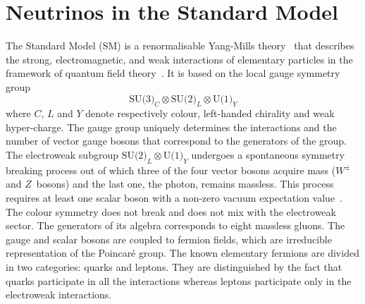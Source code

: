 
\clearpage
\chapter{Neutrinos in the Standard Model}
\label{cha:intro}

The Standard Model (SM) is a renormalisable Yang-Mills theory~\cite{Yang:1954ek} that describes the strong, %
electromagnetic, and weak interactions of elementary particles in the framework of quantum field %
theory~\cite{Glashow:1961tr, Weinberg:1967tq, Salam:1968rm}.
It is based on the local gauge symmetry group 
\begin{equation}
	\label{eq:smgroup}
	\text{SU(3)}_C \otimes \text{SU(2)}_L \otimes \text{U(1)}_Y
\end{equation}
where $C$, $L$ and $Y$ denote respectively colour, left-handed chirality and weak hyper-charge.
The gauge group uniquely determines the interactions and the number of %
vector gauge bosons that correspond to the generators of the group.
%
The electroweak subgroup $\text{SU(2)}_L \otimes \text{U(1)}_Y$ undergoes a spontaneous symmetry breaking process %
out of which three of the four vector bosons acquire mass ($W^\pm$ and $Z$~bosons) and the last one, the photon, remains massless.
This process requires at least one scalar boson with a non-zero vacuum expectation value~\cite{Higgs:1964pj, Higgs:1964ia}.
The colour symmetry does not break and does not mix with the electroweak sector. 
The generators of its algebra corresponds to eight massless gluons.
The gauge and scalar bosons are coupled to fermion fields, which are irreducible representation of %
the Poincaré group.
The known elementary fermions are divided in two categories: quarks and leptons.
They are distinguished by the fact that quarks participate in all the interactions %
whereas leptons participate only in the electroweak interactions.
